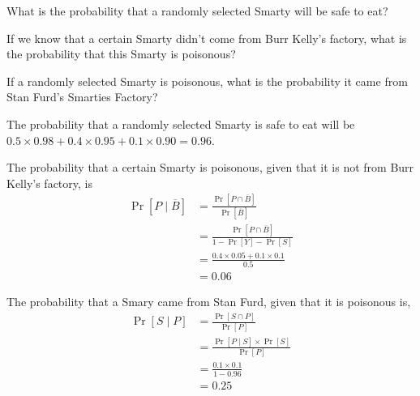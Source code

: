 \documentclass[11pt]{article}
\begin{document}
\begin{Parts}
\Part
What is the probability that a randomly selected Smarty will be safe to eat?

\Part
If we know that a certain Smarty didn't come from Burr Kelly's factory, what is 
the probability that this Smarty is poisonous?

\Part
If a randomly selected Smarty is poisonous, what is the probability it came from 
Stan Furd's Smarties Factory?

\end{Parts}

\begin{solution}
    
\begin{Parts}
    
\Part The probability that a randomly selected Smarty is safe to eat will be 
$0.5 \times 0.98 + 0.4 \times 0.95 + 0.1 \times 0.90 =  0.96$. 

\Part The probability that a certain Smarty is poisonous, given that it is not
from Burr Kelly's factory, is
\[
    \begin{split}
        \Pr[P \mid \overline{B}] &= \frac{\Pr[P \cap \overline{B}]}{\Pr[\overline{B}]} \\
        &= \frac{\Pr[P \cap \overline{B}]}{1 - \Pr[Y] - \Pr[S]} \\
        &= \frac{0.4 \times 0.05 + 0.1 \times 0.1}{0.5} \\
        &= 0.06
    \end{split}
\]

\Part The probability that a Smary came from Stan Furd, given that it is poisonous
is, 
\[
    \begin{split}
        \Pr[S \mid P] &= \frac{\Pr[S \cap P]}{\Pr[P]} \\
        &= \frac{\Pr[P \mid S] \times \Pr[S]}{\Pr[P]} \\
        &= \frac{0.1 \times 0.1}{1 - 0.96} \\
        &= 0.25
    \end{split}
\]

\end{Parts}

\end{solution}

\end{document}

